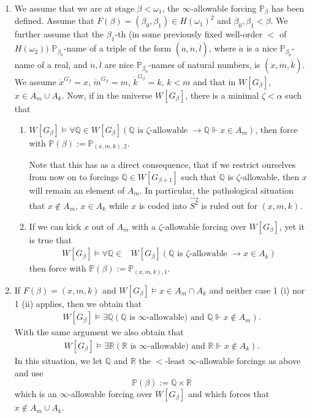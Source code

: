 \documentclass[a4paper,11pt]{article}
\newcommand{\forceP}{\mathbb{P}}
\newcommand{\forceQ}{\mathbb{Q}}
\newcommand{\forceR}{\mathbb{R}}
\begin{document}
\begin{enumerate}
\item  We assume that we are at stage $\beta < \omega_1$, the $\infty$-allowable forcing $\forceP_{\beta}$ has been defined.
Assume that $F(\beta)=(\beta_0,\beta_1) \in H(\omega_1)^2$ and $\beta_0, \beta_1 < \beta$.
We further assume that the $\beta_1$-th (in some previously fixed well-order $<$ of $H(\omega_2))$ $\forceP_{\beta_0}$-name of a triple of the form $(\dot{a},\dot{n}, \dot{l})$, where $\dot{a}$ is a nice $\forceP_{\beta_0}$-name of a real, and $\dot{n}, \dot{l}$ are nice $\forceP_{\beta_0}$-names of natural numbers, is $(\dot{x},\dot{m},\dot{k})$. We assume $\dot{x}^{G_{\beta}}=x$, $\dot{m}^{G_{\beta}}=m$, $\dot{k}^{G_{\beta}}= k$, $k<m$ and that in $W[G_{\beta}]$, $x \in A_m \cup A_k$. 
Now,
if in the universe $W[G_{\beta}]$,
there is a minimal $\zeta < \alpha$ such that
\begin{enumerate}
\item[(i)]$ W[G_{\beta}] \models \forall \forceQ \in W[G_{\beta}] (\forceQ \text{ is $\zeta$-allowable } \rightarrow \forceQ \Vdash x \in A_m)
$, then force with $\forceP(\beta):= \forceP_{(x,m,k),2}$.

Note that this has as a direct consequence, that if we restrict ourselves from now on to forcings $\forceQ \in W[G_{\beta+1}]$ such that $ \forceQ$ is $\zeta$-allowable, then $x$ will remain an element of $A_m$. In particular, the pathological situation that $x \notin A_m$, $x \in A_k$ while $x$ is coded into $\vec{S^2}$ is ruled out for $(x,m,k)$.

\item[(ii)] If we can kick $x$ out of $A_m$ with a $\zeta$-allowable forcing over $W[G_{\beta}]$, yet it is true that
\begin{align*}
  W[G_{\beta}] \models \forall \forceQ \in &W[G_{\beta}]( \forceQ \text{ is $\zeta$-allowable } \rightarrow x \in A_k)
\end{align*}
then force with $\forceP(\beta):=\forceP_{(x,m,k),1}$.

\end{enumerate}

 


\item If $F(\beta)=(x,m,k)$ and $W[G_{\beta}]\models x \in A_m \cap A_k$ and neither case 1 (i) nor 1 (ii) applies, then we obtain that
\begin{align*}
W[G_{\beta}] \models \exists \forceQ (\forceQ \text{ is } \infty\text{-allowable) and }  \forceQ \Vdash x \notin A_m).
\end{align*}
With the same argument we also obtain that
\begin{align*}
W[G_{\beta}] \models \exists \forceR (\forceR \text{ is } \infty\text{-allowable) and }  \forceR \Vdash x \notin A_k).
\end{align*}
In this situation, we let $\forceQ$ and $\forceR$ the $<$-least $\infty$-allowable forcings as above and use
\[ \forceP(\beta):= \forceQ \times \forceR \]
which is an $\infty$-allowable forcing over $W[G_{\beta}]$ and which forces that $x \notin A_m \cup A_k$.



\end{enumerate}
\end{document}
